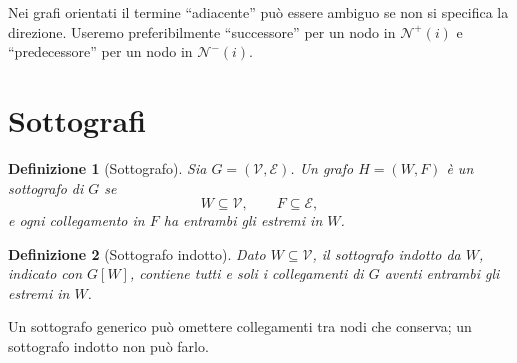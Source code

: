 \documentclass[11pt,a4paper]{article}
\newtheorem{definition}{Definizione}[section]
\newcommand{\V}{\mathcal{V}}
\newcommand{\E}{\mathcal{E}}
\newcommand{\N}{\mathcal{N}}
\begin{document}
\begin{warningbox}
Nei grafi orientati il termine ``adiacente'' può essere ambiguo se non si specifica la direzione. Useremo preferibilmente ``successore'' per un nodo in $\N^+(i)$ e ``predecessore'' per un nodo in $\N^-(i)$.
\end{warningbox}

\section{Sottografi}

\begin{definition}[Sottografo]
Sia $G=(\V,\E)$. Un grafo $H=(W,F)$ è un sottografo di $G$ se
\[
W\subseteq\V,\qquad F\subseteq\E,
\]
e ogni collegamento in $F$ ha entrambi gli estremi in $W$.
\end{definition}

\begin{definition}[Sottografo indotto]
Dato $W\subseteq\V$, il sottografo indotto da $W$, indicato con $G[W]$, contiene tutti e soli i collegamenti di $G$ aventi entrambi gli estremi in $W$.
\end{definition}

Un sottografo generico può omettere collegamenti tra nodi che conserva; un sottografo indotto non può farlo.
\end{document}
